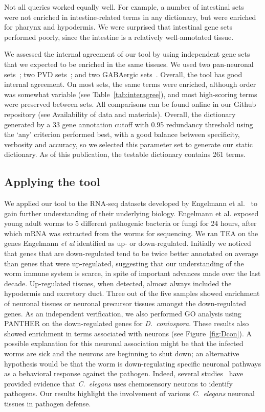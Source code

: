 \documentclass{bmcart}
\begin{document}
Not all queries worked equally well. For example, a number of intestinal  sets~\cite{Spencer2011, Pauli2006} were not enriched in intestine-related terms in any dictionary, but were enriched for pharynx and hypodermis. We were  surprised that intestinal gene sets performed poorly, since the intestine is a relatively well-annotated tissue. 

We assessed the internal agreement of our tool by using independent gene sets that we expected to be enriched in the same tissues. We used two  pan-neuronal sets~\cite{Spencer2011, Watson2008a}; two PVD sets~\cite{Spencer2011, Smith2010}; and two  GABAergic sets~\cite{Spencer2011, Cinar2005}. Overall, the tool has good internal agreement. On most sets, the same terms were enriched, although order was somewhat variable (see Table~\ref{tab:interagree}), and most high-scoring terms were preserved between sets. All comparisons can be found online in our Github repository (see Availability of data and materials). Overall, the dictionary generated by a 33 gene annotation cutoff with 0.95 redundancy threshold using the `any' criterion performed best, with a good balance between specificity, verbosity and accuracy, so we selected this parameter set to generate our static dictionary. As of this publication, the testable dictionary contains 261 terms. 


\subsection*{Applying the tool}
We applied our tool to the RNA-seq datasets developed by Engelmann et al.~\cite{Engelmann2011} to gain further understanding of their underlying biology. Engelmann et al. exposed young adult worms to 5 different pathogenic bacteria or fungi for 24 hours, after which mRNA was extracted from the worms for sequencing. We ran TEA on the genes Engelmann \emph{et al} identified as up- or down-regulated. Initially we noticed that genes that are down-regulated tend to be twice better annotated on average than genes that were up-regulated, suggesting that our understanding of the worm immune system is scarce, in spite of important advances made over the last decade. Up-regulated tissues, when detected, almost always included the hypodermis and excretory duct. Three out of the five samples showed enrichment of neuronal tissues or neuronal precursor tissues amongst the down-regulated genes. As an independent verification, we also performed GO analysis using PANTHER on the down-regulated genes for \emph{D.~coniospora}. These results also showed enrichment in terms associated with neurons (see Figure~\ref{fig:Dcon}). A possible explanation for this neuronal association might be that the infected worms are sick and the neurons are beginning to shut down; an alternative hypothesis would be that the worm is down-regulating specific neuronal pathways as a behavioral response against the pathogen. Indeed, several studies~\cite{Meisel2014, Zhang2005} have provided evidence that \emph{C.~elegans} uses chemosensory neurons to identify pathogens. Our results highlight the involvement of various \emph{C.~elegans} neuronal tissues in pathogen defense.
\end{document}
